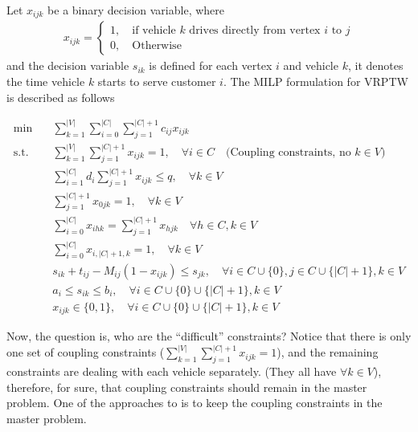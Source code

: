         Let $x_{ijk}$ be a binary decision variable, where
        \begin{align*}
            x_{ijk} = \begin{cases}
                1, \quad \text{if vehicle $k$ drives directly from vertex $i$ to $j$}\\
                0, \quad \text{Otherwise}
            \end{cases}
        \end{align*}
        and the decision variable $s_{ik}$ is defined for each vertex $i$ and vehicle $k$, it denotes the time vehicle $k$ starts to serve customer $i$. The MILP formulation for VRPTW is described as follows

        \begin{align*}
            \min \quad & \sum_{k = 1}^{|V|}\sum_{i = 0}^{|C|}\sum_{j = 1}^{|C| + 1} c_{ij} x_{ijk}\\
            \text{s.t.} \quad & \sum_{k = 1}^{|V|}\sum_{j = 1}^{|C| + 1} x_{ijk} = 1, \quad \forall i \in C \quad \text{(Coupling constraints, no $k \in V$)}\\
            & \sum_{i = 1}^{|C|} d_i \sum_{j = 1}^{|C| + 1} x_{ijk} \le q, \quad \forall k \in V \\
            & \sum_{j = 1}^{|C| + 1} x_{0jk} = 1, \quad \forall k \in V\\
            & \sum_{i = 0}^{|C|} x_{ihk} = \sum_{j = 1}^{|C| + 1} x_{hjk} \quad \forall h \in C, k \in V\\
            & \sum_{i = 0}^{|C|} x_{i, |C|+1, k} = 1, \quad \forall k \in V\\
            & s_{ik} + t_{ij} - M_{ij} (1 - x_{ijk}) \le s_{jk}, \quad \forall i \in C \cup \{0\}, j \in C \cup \{|C| + 1\}, k \in V\\
            & a_i \le s_{ik} \le b_i, \quad \forall i \in C \cup \{0\} \cup \{|C| + 1\}, k \in V\\
            & x_{ijk} \in \{0, 1\}, \quad \forall i \in C \cup \{0\} \cup \{|C| + 1\}, k \in V
        \end{align*}

        Now, the question is, who are the ``difficult'' constraints? Notice that there is only one set of coupling constraints ($\sum_{k = 1}^{|V|}\sum_{j = 1}^{|C| + 1} x_{ijk} = 1$), and the remaining constraints are dealing with each vehicle separately. (They all have $\forall k \in V$), therefore, for sure, that coupling constraints should remain in the master problem. One of the approaches to is to keep the coupling constraints in the master problem. 

